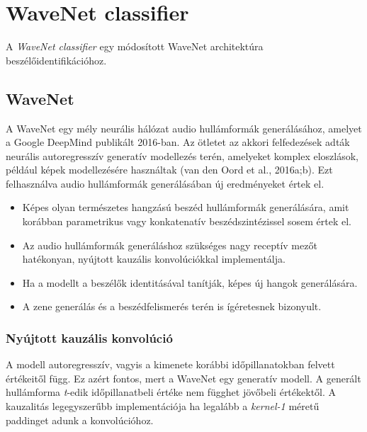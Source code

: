 \section{WaveNet classifier}

A \emph{WaveNet classifier} egy módosított WaveNet architektúra beszélőidentifikációhoz.

\subsection{WaveNet}

A WaveNet egy mély neurális hálózat audio hullámformák generálásához, amelyet a Google DeepMind publikált 2016-ban. Az ötletet az akkori felfedezések adták neurális autoregresszív generatív modellezés terén, amelyeket komplex eloszlások, például képek modellezésére használtak (van den Oord et al., 2016a;b). Ezt felhasználva audio hullámformák generálásában új eredményeket értek el.

\begin{itemize}
	\item Képes olyan természetes hangzású beszéd hullámformák generálására, amit korábban parametrikus vagy konkatenatív beszédszintézissel sosem értek el. 
	\item Az audio hullámformák generáláshoz szükséges nagy receptív mezőt hatékonyan, nyújtott kauzális konvolúciókkal implementálja.
	\item Ha a modellt a beszélők identitásával tanítják, képes új hangok generálására.
	\item A zene generálás és a beszédfelismerés terén is ígéretesnek bizonyult.
\end{itemize}

\subsubsection{Nyújtott kauzális konvolúció}

A modell autoregresszív, vagyis a kimenete korábbi időpillanatokban felvett értékeitől függ. Ez azért fontos, mert a WaveNet egy generatív modell. A generált hullámforma \emph{t}-edik időpillanatbeli értéke nem függhet jövőbeli értékektől. A kauzalitás legegyszerűbb implementációja ha legalább a \emph{kernel-1} méretű paddinget adunk a konvolúcióhoz.

